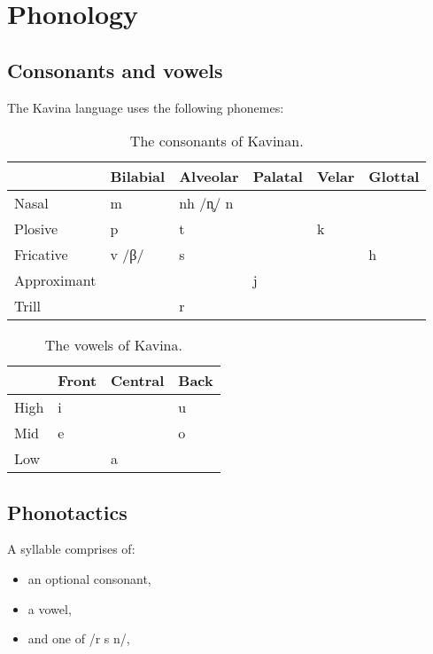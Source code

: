 \documentclass{book}
\newcommand{\invalid}{\cellcolor{RedOrange!40}}
\begin{document}
\chapter{Phonology}

\section{Consonants and vowels}

The Kavina language uses the following phonemes:

\begin{table}[h]
    \caption{The consonants of Kavinan.}
    \centering
    \begin{tabular}{|l|l|l|l|l|l|}
        \hline
        & Bilabial & Alveolar & Palatal & Velar & Glottal \\
        \hline
        Nasal & m & nh /n̥/ n & & & \invalid \\
        Plosive & p & t & & k & \\
        Fricative & v /β/ & s & & & h \\
        Approximant & & & j & & \\
        Trill & & r & & \invalid & \invalid \\
        \hline
    \end{tabular}
\end{table}
\begin{table}[h]
\centering
    \caption{The vowels of Kavina.}
    \begin{tabular}{|l|l|l|l|}
        \hline
        & Front & Central & Back \\
        \hline
        High & i & & u \\
        Mid & e & & o \\
        Low & & a & \\
        \hline
    \end{tabular}
\end{table}

\section{Phonotactics}

A syllable comprises of:

\begin{itemize}
    \item an optional consonant,
    \item a vowel,
    \item and one of /r s n/,
\end{itemize}
\end{document}

